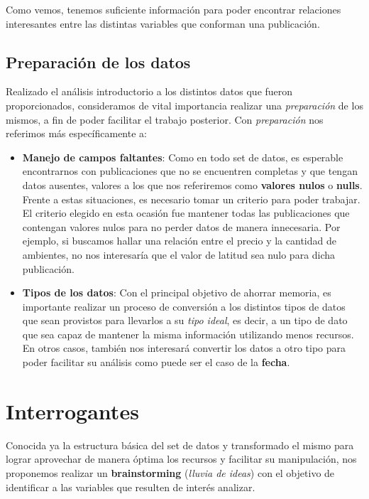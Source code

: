 \documentclass[
10pt, %
a4paper, %
oneside, %
headinclude,footinclude, %
BCOR5mm, %
]{scrartcl}
\begin{document}
Como vemos, tenemos suficiente informaci\'on para poder encontrar relaciones interesantes entre las distintas variables que conforman una publicaci\'on.


\subsection{Preparaci\'on de los datos}

Realizado el an\'alisis introductorio a los distintos datos que fueron proporcionados, consideramos de vital importancia realizar una \textit{preparaci\'on} de los mismos, a fin de poder facilitar el trabajo posterior. Con \textit{preparaci\'on} nos referimos m\'as espec\'ificamente a:

\begin{itemize}
    \item \textbf{Manejo de campos faltantes}: Como en todo set de datos, es esperable encontrarnos con publicaciones que no se encuentren completas y que tengan datos ausentes, valores a los que nos referiremos como \textbf{valores nulos} o \textbf{nulls}. Frente a estas situaciones, es necesario tomar un criterio para poder trabajar. El criterio elegido en esta ocasi\'on fue mantener todas las publicaciones que contengan valores nulos para no perder datos de manera innecesaria. Por ejemplo, si buscamos hallar una relaci\'on entre el precio y la cantidad de ambientes, no nos interesar\'ia que el valor de latitud sea nulo para dicha publicaci\'on.

    \item \textbf{Tipos de los datos}: Con el principal objetivo de ahorrar memoria, es importante realizar un proceso de conversi\'on a los distintos tipos de datos que sean provistos para llevarlos a su \textit{tipo ideal}, es decir, a un tipo de dato que sea capaz de mantener la misma informaci\'on utilizando menos recursos. En otros casos, tambi\'en nos interesar\'a convertir los datos a otro tipo para poder facilitar su an\'alisis como puede ser el caso de la \textbf{fecha}.
    
\end{itemize}

\section{Interrogantes}

Conocida ya la estructura b\'asica del set de datos y transformado el mismo para lograr aprovechar de manera \'optima los recursos y facilitar su manipulaci\'on, nos proponemos realizar un \textbf{brainstorming} (\textit{lluvia de ideas}) con el objetivo de identificar a las variables que resulten de inter\'es analizar.
\end{document}
